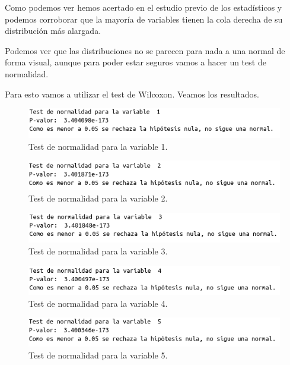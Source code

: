 \documentclass[12pt,a4paper]{article}
\begin{document}
Como podemos ver hemos acertado en el estudio previo de los estadísticos y podemos corroborar que la mayoría de variables tienen la cola derecha de su distribución más alargada. 

Podemos ver que las distribuciones no se parecen para nada a una normal de forma visual, aunque para poder estar seguros vamos a hacer un test de normalidad.

Para esto vamos a utilizar el test de Wilcoxon. Veamos los resultados.

\begin{figure}[H]
	\centering
	\includegraphics[scale=0.65]{./Imagenes/EDA/Regresion/test_normalidad1.png}
	\caption{Test de normalidad para la variable 1.}
\end{figure}

\begin{figure}[H]
	\centering
	\includegraphics[scale=0.65]{./Imagenes/EDA/Regresion/test_normalidad2.png}
	\caption{Test de normalidad para la variable 2.}
\end{figure}
\begin{figure}[H]
	\centering
	\includegraphics[scale=0.65]{./Imagenes/EDA/Regresion/test_normalidad3.png}
	\caption{Test de normalidad para la variable 3.}
\end{figure}

\begin{figure}[H]
	\centering
	\includegraphics[scale=0.65]{./Imagenes/EDA/Regresion/test_normalidad4.png}
	\caption{Test de normalidad para la variable 4.}
\end{figure}

\begin{figure}[H]
	\centering
	\includegraphics[scale=0.65]{./Imagenes/EDA/Regresion/test_normalidad5.png}
	\caption{Test de normalidad para la variable 5.}
\end{figure}
\end{document}
